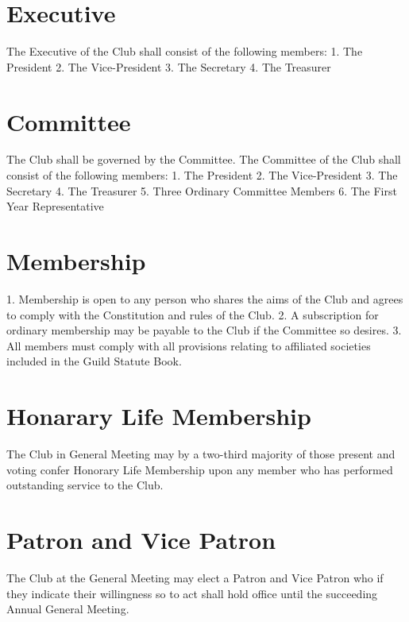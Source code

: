\documentclass[12pt]{article} %
\begin{document}
\section{Executive}
The Executive of the Club shall consist of the following members:
1. The President
2. The Vice-President
3. The Secretary
4. The Treasurer

\section{Committee}
The Club shall be governed by the Committee.
The Committee of the Club shall consist of the following members:
1. The President
2. The Vice-President
3. The Secretary
4. The Treasurer
5. Three Ordinary Committee Members
6. The First Year Representative

\section{Membership}
1. Membership is open to any person who shares the aims of the Club and agrees to
comply with the Constitution and rules of the Club.
2. A subscription for ordinary membership may be payable to the Club if the Committee
so desires.
3. All members must comply with all provisions relating to affiliated societies included
in the Guild Statute Book.

\section{Honarary Life Membership}
The Club in General Meeting may by a two-third majority of those present and voting confer
Honorary Life Membership upon any member who has performed outstanding service to the
Club.

\section{Patron and Vice Patron}
The Club at the General Meeting may elect a Patron and Vice Patron who if they indicate
their willingness so to act shall hold office until the succeeding Annual General Meeting.
\end{document}
